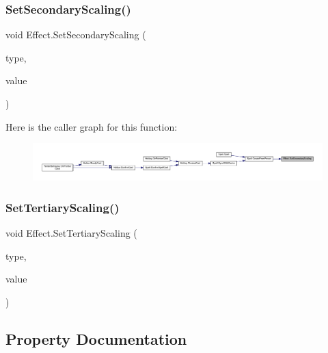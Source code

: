\subsubsection{\texorpdfstring{SetSecondaryScaling()}{SetSecondaryScaling()}}
{\footnotesize\ttfamily void Effect.\+Set\+Secondary\+Scaling (\begin{DoxyParamCaption}\item[{\mbox{\hyperlink{class_effect_af0ada789de40f58c24c46bf8ed2f300c}{Scaling\+Type}}}]{type,  }\item[{float}]{value }\end{DoxyParamCaption})}

Here is the caller graph for this function\+:
\nopagebreak
\begin{figure}[H]
\begin{center}
\leavevmode
\includegraphics[width=350pt]{class_effect_a476b569a5adf97f1b691dcbb7e5cb325_icgraph}
\end{center}
\end{figure}
\mbox{\label{class_effect_a021b689f1ccd675bc1b6fefe3071253f}} 
\subsubsection{\texorpdfstring{SetTertiaryScaling()}{SetTertiaryScaling()}}
{\footnotesize\ttfamily void Effect.\+Set\+Tertiary\+Scaling (\begin{DoxyParamCaption}\item[{\mbox{\hyperlink{class_effect_af0ada789de40f58c24c46bf8ed2f300c}{Scaling\+Type}}}]{type,  }\item[{float}]{value }\end{DoxyParamCaption})}



\subsection{Property Documentation}
\mbox{\label{class_effect_abee804d3dd2ba5e3074d9fde9beedf07}} 
